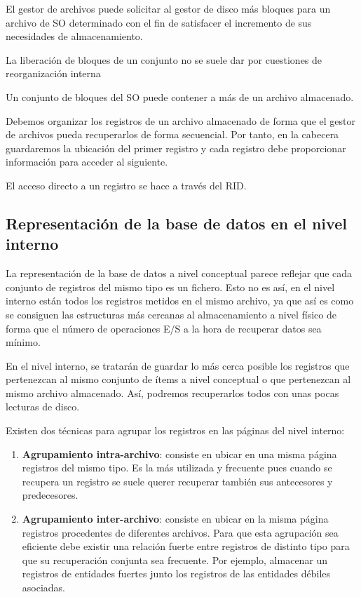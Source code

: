 \documentclass[10pt,a4paper,spanish]{report}
\begin{document}
El gestor de archivos puede solicitar al gestor de disco más bloques para un archivo de SO determinado con el fin de satisfacer el incremento de sus necesidades de almacenamiento.

La liberación de bloques de un conjunto no se suele dar por cuestiones de reorganización interna

Un conjunto de bloques del SO puede contener a más de un archivo almacenado.

Debemos organizar los registros de un archivo almacenado de forma que el gestor de archivos pueda recuperarlos de forma secuencial. Por tanto, en la cabecera guardaremos la ubicación del primer registro y cada registro debe proporcionar información para acceder al siguiente.

El acceso directo a un registro se hace a través del RID.

\textcolor[rgb]{1,0.2,0.3}{\section{Representación de la base de datos en el nivel interno}}
La representación de la base de datos a nivel conceptual parece reflejar que cada conjunto de registros del mismo tipo es un fichero. Esto no es así, en el nivel interno están todos los registros metidos en el mismo archivo, ya que así es como se consiguen las estructuras más cercanas al almacenamiento a nivel físico de forma que el número de operaciones E/S a la hora de recuperar datos sea mínimo.

En el nivel interno, se tratarán de guardar lo más cerca posible los registros que pertenezcan al mismo conjunto de ítems a nivel conceptual o que pertenezcan al mismo archivo almacenado. Así, podremos recuperarlos todos con unas pocas lecturas de disco.

Existen dos técnicas para agrupar los registros en las páginas del nivel interno:
\begin{enumerate}[$\heartsuit$]
    \item \textcolor[rgb]{1,0.2,0.3}{\textbf{Agrupamiento intra-archivo}}: consiste en ubicar en una misma página registros del mismo tipo. Es la más utilizada y frecuente pues cuando se recupera un registro se suele querer recuperar también sus antecesores y predecesores.
    \item \textcolor[rgb]{1,0.2,0.3}{\textbf{Agrupamiento inter-archivo}}: consiste en ubicar en la misma página registros procedentes de diferentes archivos. Para que esta agrupación sea eficiente debe existir una relación fuerte entre registros de distinto tipo para que su recuperación conjunta sea frecuente. Por ejemplo, almacenar un registros de entidades fuertes junto los registros de las entidades débiles asociadas.
\end{enumerate}
\end{document}
